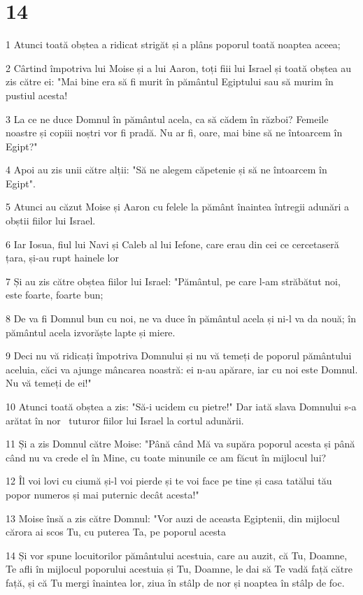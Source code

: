 \chapter{14}

\par 1 Atunci toată obștea a ridicat strigăt și a plâns poporul toată noaptea aceea;
\par 2 Cârtind împotriva lui Moise și a lui Aaron, toți fiii lui Israel și toată obștea au zis către ei: "Mai bine era să fi murit în pământul Egiptului sau să murim în pustiul acesta!
\par 3 La ce ne duce Domnul în pământul acela, ca să cădem în război? Femeile noastre și copiii noștri vor fi pradă. Nu ar fi, oare, mai bine să ne întoarcem în Egipt?"
\par 4 Apoi au zis unii către alții: "Să ne alegem căpetenie și să ne întoarcem în Egipt".
\par 5 Atunci au căzut Moise și Aaron cu felele la pământ înaintea întregii adunări a obștii fiilor lui Israel.
\par 6 Iar Iosua, fiul lui Navi și Caleb al lui Iefone, care erau din cei ce cercetaseră țara, și-au rupt hainele lor
\par 7 Și au zis către obștea fiilor lui Israel: "Pământul, pe care l-am străbătut noi, este foarte, foarte bun;
\par 8 De va fi Domnul bun cu noi, ne va duce în pământul acela și ni-l va da nouă; în pământul acela izvorăște lapte și miere.
\par 9 Deci nu vă ridicați împotriva Domnului și nu vă temeți de poporul pământului aceluia, căci va ajunge mâncarea noastră: ei n-au apărare, iar cu noi este Domnul. Nu vă temeți de ei!"
\par 10 Atunci toată obștea a zis: "Să-i ucidem cu pietre!" Dar iată slava Domnului s-a arătat în nor  tuturor fiilor lui Israel la cortul adunării.
\par 11 Și a zis Domnul către Moise: "Până când Mă va supăra poporul acesta și până când nu va crede el în Mine, cu toate minunile ce am făcut în mijlocul lui?
\par 12 Îl voi lovi cu ciumă și-l voi pierde și te voi face pe tine și casa tatălui tău popor numeros și mai puternic decât acesta!"
\par 13 Moise însă a zis către Domnul: "Vor auzi de aceasta Egiptenii, din mijlocul cărora ai scos Tu, cu puterea Ta, pe poporul acesta
\par 14 Și vor spune locuitorilor pământului acestuia, care au auzit, că Tu, Doamne, Te afli în mijlocul poporului acestuia și Tu, Doamne, le dai să Te vadă față către față, și că Tu mergi înaintea lor, ziua în stâlp de nor și noaptea în stâlp de foc.
